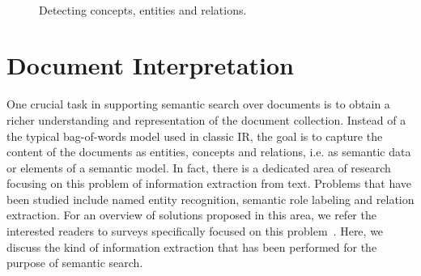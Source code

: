 
 
\begin{figure}[htb]
	\centering
  ~ %
  \caption{Detecting concepts, entities and relations.}
  \label{fig:extraction}
\end{figure}

\section{Document Interpretation}\label{sec:content}
	
One crucial task in supporting semantic search over documents is to obtain a richer understanding and representation of the document collection. Instead of a the typical bag-of-words model used in classic IR, the goal is to capture the content of the documents as entities, concepts and relations, i.e. as semantic data or elements of a semantic model. In fact, there is a dedicated area of research focusing on this problem of information extraction from text. Problems that have been studied include named entity recognition, semantic role labeling and relation extraction. For an overview of solutions proposed in this area, we refer the interested readers to surveys specifically focused on this problem~\cite{DBLP:journals/tkde/ChangKGS06}. Here, we discuss the kind of information extraction that has been performed for the purpose of semantic search. 

